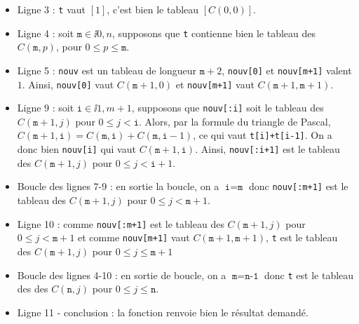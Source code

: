 \begin{itemize}
  \item[\textbullet] Ligne 3 : \texttt{t} vaut $[1]$, c'est bien le tableau $[C(0,0)]$.
  \item[\textbullet] Ligne 4 : soit $\texttt{m} \in \ii{0,n}$, supposons que \texttt{t} contienne bien le tableau des $C(\texttt{m},p)$, pour $0\leq p \leq \texttt{m}$. 
  \item[\textbullet] Ligne 5 : \texttt{nouv} est un tableau de longueur $\texttt{m}+2$, \texttt{nouv[0]} et \texttt{nouv[m+1]} valent $1$. 
    Ainsi, \texttt{nouv[0]} vaut $C(\texttt{m}+1,0)$ et \texttt{nouv[m+1]} vaut $C(\texttt{m}+1,\texttt{m}+1)$.
  \item[\textbullet] Ligne 9 : soit $\texttt{i} \in \ii{1,m+1}$, supposons que \texttt{nouv[:i]} soit le tableau des $C(\texttt{m}+1,j)$ pour $0\leq j < \texttt{i}$. 
    Alors, par la formule du triangle de Pascal, $C(\texttt{m}+1,\texttt{i}) = C(\texttt{m},\texttt{i}) + C(\texttt{m},\texttt{i}-1)$, ce qui vaut \texttt{t[i]+t[i-1]}. 
    On a donc bien \texttt{nouv[i]} qui vaut $C(\texttt{m}+1,\texttt{i})$. Ainsi, \texttt{nouv[:i+1]} est le tableau des $C(\texttt{m}+1,j)$ pour $0\leq j < \texttt{i}+1$. 
  \item[\textbullet] Boucle des lignes 7-9 : en sortie la boucle, on a $\texttt{i} = \texttt{m}$ donc \texttt{nouv[:m+1]} est le tableau des $C(\texttt{m}+1,j)$ pour $0\leq j < \texttt{m}+1$. 
  \item[\textbullet] Ligne 10 : comme \texttt{nouv[:m+1]} est le tableau des $C(\texttt{m}+1,j)$ pour $0\leq j < \texttt{m}+1$ et comme \texttt{nouv[m+1]} vaut $C(\texttt{m}+1,\texttt{m}+1)$, \texttt{t} est le tableau des $C(\texttt{m}+1,j)$ pour $0\leq j \leq \texttt{m}+1$
  \item[\textbullet] Boucle des lignes 4-10 : en sortie de boucle, on a $\texttt{m} = \texttt{n-1}$ donc  \texttt{t} est le tableau des des $C(\texttt{n},j)$ pour $0\leq j \leq \texttt{n}$. 
  \item[\textbullet] Ligne 11 - conclusion : la fonction renvoie bien le résultat demandé.
\end{itemize}